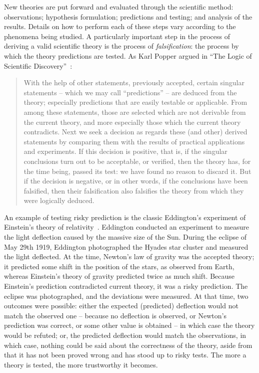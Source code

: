 New theories are put forward and evaluated through the scientific method: observations; hypothesis formulation; predictions and testing; and analysis of the results. Details on how to perform each of these steps vary according to the phenomena being studied. A particularly important step in the process of deriving a valid scientific theory is the process of \emph{falsification}: the process by which the theory  predictions are tested. As Karl Popper argued in ``The Logic of Scientific Discovery''~\cite[p. 9]{popper-scientificdiscovery}:

 {\singlespace
 \begin{quote}
With the help of other statements, previously accepted, certain singular statements  --  which we may call ``predictions'' -- are deduced from the theory; especially predictions that are easily testable or applicable. From among these statements, those are selected which are not derivable from the current theory, and more especially those which the current theory contradicts. Next we seek a decision as regards these (and other) derived statements by comparing them with the results of practical applications and experiments. If this decision is positive, that is, if the singular conclusions turn out to be acceptable, or verified, then the theory has, for the time being, passed its test: we have found no reason to discard it. But if the decision is negative, or in other words, if the conclusions have been falsified, then their falsification also falsifies the theory from which they were logically deduced.
 \end{quote}}
 
% 
An example of testing risky prediction is the classic Eddington's experiment of Einstein's theory of relativity~\cite{coles2001einstein}. Eddington conducted an experiment to measure the light deflection caused by the massive size of the Sun.  During the eclipse of May 29th 1919, Eddington photographed the Hyades star cluster and measured the light deflected. At the time, Newton's law of gravity was the accepted theory; it predicted some shift in the position of the stars, as observed from Earth, whereas Einstein's theory of gravity predicted twice as much shift. Because Einstein's prediction contradicted current theory, it was a risky prediction.
%
The eclipse was photographed, and the deviations were measured.  At that time, two outcomes were possible: either the expected (predicted) deflection would not match the observed one -- because no deflection is observed, or Newton's prediction was correct, or some other value is obtained --  in which case the theory would be refuted; or, the predicted deflection would match the observations, in which case, nothing could be said about the correctness of the theory, aside from that it has not been proved wrong and has stood up to risky tests. The more a theory is tested, the more trustworthy it becomes. 

